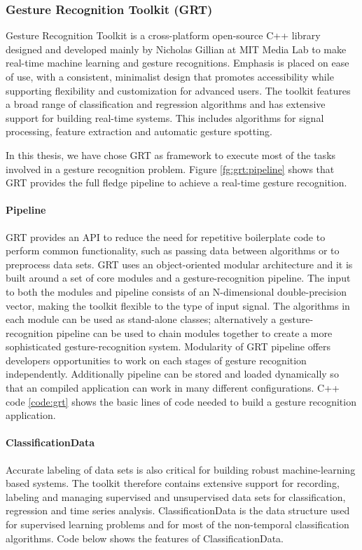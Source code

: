 \subsubsection{Gesture Recognition Toolkit (GRT)} \label{sec:grt} Gesture Recognition Toolkit is a cross-platform open-source C++ library designed and developed mainly by Nicholas Gillian at MIT Media Lab to make real-time machine learning and gesture recognitions. Emphasis is placed on ease of use, with a consistent, minimalist design that promotes accessibility while supporting flexibility and customization for advanced users. The toolkit features a broad range of classification and regression algorithms and has extensive support for building real-time systems. This includes algorithms for signal processing, feature extraction and automatic gesture spotting. 

In this thesis, we have chose GRT as framework to execute most of the tasks involved in a gesture recognition problem. Figure \ref{fg:grt:pipeline} shows that GRT provides the full fledge pipeline to achieve a real-time gesture recognition. 



\paragraph*{Pipeline} GRT provides an API to reduce the need for repetitive boilerplate code to perform common functionality, such as passing data between algorithms or to preprocess data sets. GRT uses an object-oriented modular architecture and it is built around a set of core modules and a gesture-recognition pipeline. The input to both the modules and pipeline consists of an N-dimensional double-precision vector, making the toolkit flexible to the type of input signal. The algorithms in each module can be used as stand-alone classes; alternatively a gesture-recognition pipeline can be used to chain modules together to create a more sophisticated gesture-recognition system. Modularity of GRT pipeline offers developers opportunities to work on each stages of gesture recognition independently. Additionally pipeline can be stored and loaded dynamically so that an compiled application can work in many different configurations. C++ code \ref{code:grt} shows the basic lines of code needed to build a gesture recognition application.

 \label{code:grt}

\paragraph*{ClassificationData} Accurate labeling of data sets is also critical for building robust machine-learning based systems. The toolkit therefore contains extensive support for recording, labeling and managing supervised and unsupervised data sets for classification, regression and time series analysis. ClassificationData is the data structure used for supervised learning problems and for most of the non-temporal classification algorithms. Code below shows the features of ClassificationData.

